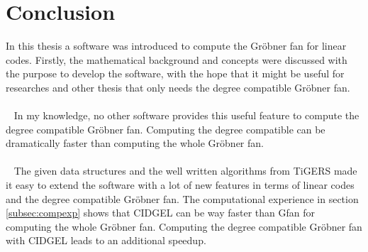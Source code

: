 \section{Conclusion}
\label{sec:concl}

In this thesis a software was introduced to compute the Gröbner fan for linear codes. Firstly, the mathematical background and concepts were discussed with the purpose to develop the software, with the hope that it might be useful for researches and other thesis that only needs the degree compatible Gröbner fan.\\
\\~
In my knowledge, no other software provides this useful feature to compute the degree compatible Gröbner fan. Computing the degree compatible can be dramatically faster than computing the whole Gröbner fan.\\
\\~
The given data structures and the well written algorithms from TiGERS \cite{tigers} made it easy to extend the software with a lot of new features in terms of linear codes and the degree compatible Gröbner fan. The computational experience in section \ref{subsec:compexp} shows that CIDGEL can be way faster than Gfan for computing the whole Gröbner fan. Computing the degree compatible Gröbner fan with CIDGEL leads to an additional speedup.